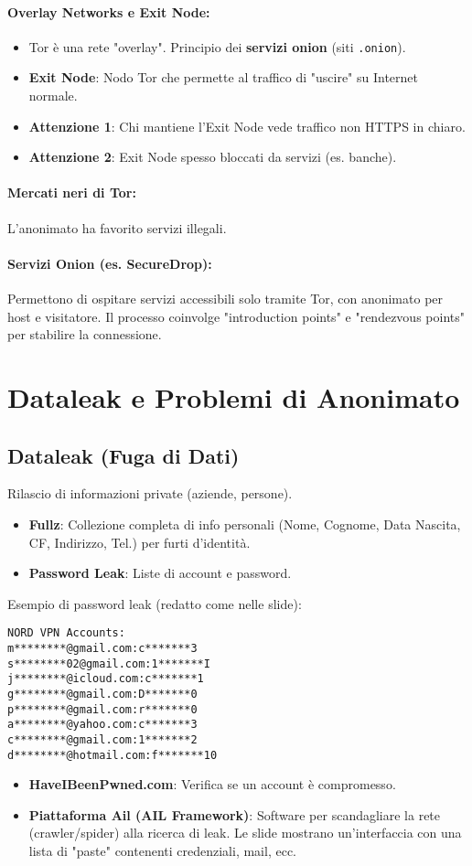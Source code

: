 \paragraph{Overlay Networks e Exit Node:}
\begin{itemize}
    \item Tor è una rete "overlay". Principio dei \textbf{servizi onion} (siti \texttt{.onion}).
    \item \textbf{Exit Node}: Nodo Tor che permette al traffico di "uscire" su Internet normale.
    \item \textbf{Attenzione 1}: Chi mantiene l'Exit Node vede traffico non HTTPS in chiaro.
    \item \textbf{Attenzione 2}: Exit Node spesso bloccati da servizi (es. banche).
\end{itemize}
\paragraph{Mercati neri di Tor:} L'anonimato ha favorito servizi illegali.
\paragraph{Servizi Onion (es. SecureDrop):} Permettono di ospitare servizi accessibili solo tramite Tor, con anonimato per host e visitatore. Il processo coinvolge "introduction points" e "rendezvous points" per stabilire la connessione.

\section{Dataleak e Problemi di Anonimato}

\subsection{Dataleak (Fuga di Dati)}
Rilascio di informazioni private (aziende, persone).
\begin{itemize}
    \item \textbf{Fullz}: Collezione completa di info personali (Nome, Cognome, Data Nascita, CF, Indirizzo, Tel.) per furti d'identità.
    \item \textbf{Password Leak}: Liste di account e password.
\end{itemize}
Esempio di password leak (redatto come nelle slide):
\begin{verbatim}
NORD VPN Accounts:
m********@gmail.com:c*******3
s********02@gmail.com:1*******I
j********@icloud.com:c*******1
g********@gmail.com:D*******0
p********@gmail.com:r*******0
a********@yahoo.com:c*******3
c********@gmail.com:1*******2
d********@hotmail.com:f*******10
\end{verbatim}
\begin{itemize}
    \item \textbf{HaveIBeenPwned.com}: Verifica se un account è compromesso.
    \item \textbf{Piattaforma Ail (AIL Framework)}: Software per scandagliare la rete (crawler/spider) alla ricerca di leak. Le slide mostrano un'interfaccia con una lista di "paste" contenenti credenziali, mail, ecc.
\end{itemize}


